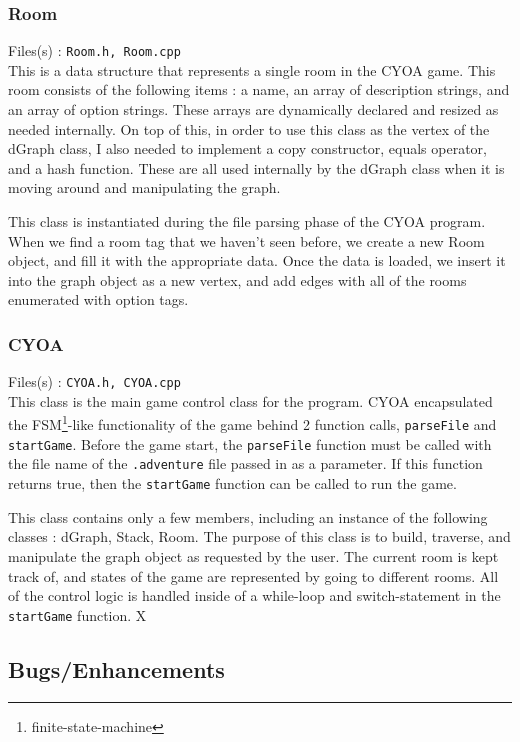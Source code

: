 \documentclass[a4paper,11pt]{article}
\begin{document}
    \subsubsection{Room}
    Files(s) : \texttt{Room.h, Room.cpp} \\
    This is a data structure that represents a single room in the CYOA game. This room consists of the following items : a name, an array of description strings, and an array of option strings. These arrays are dynamically declared and resized as needed internally. On top of this, in order to use this class as the vertex of the dGraph class, I also needed to implement a copy constructor, equals operator, and a hash function. These are all used internally by the dGraph class when it is moving around and manipulating the graph. \par
    This class is instantiated during the file parsing phase of the CYOA program. When we find a room tag that we haven't seen before, we create a new Room object, and fill it with the appropriate data. Once the data is loaded, we insert it into the graph object as a new vertex, and add edges with all of the rooms enumerated with option tags. 

    \subsubsection{CYOA}
    Files(s) : \texttt{CYOA.h, CYOA.cpp} \\
    This class is the main game control class for the program. CYOA encapsulated the FSM\footnote{finite-state-machine}-like functionality of the game behind 2 function calls, \texttt{parseFile} and \texttt{startGame}.  Before the game start, the \texttt{parseFile} function must be called with the file name of the \texttt{.adventure} file passed in as a parameter. If this function returns true, then the \texttt{startGame} function can be called to run the game. \par
    This class contains only a few members, including an instance of the following classes : dGraph, Stack, Room. The purpose of this class is to build, traverse, and manipulate the graph object as requested by the user. The current room is kept track of, and states of the game are represented by going to different rooms. All of the control logic is handled inside of a while-loop and switch-statement in the \texttt{startGame} function.
    X
    \subsection{Bugs/Enhancements}
\end{document}
